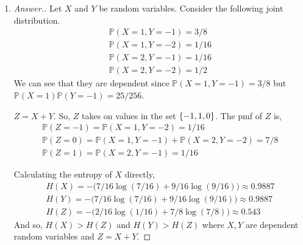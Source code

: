 \documentclass[10pt,twoside]{article}
\newcommand{\Pro}{\ensuremath{\mathbb{P}}}
\begin{document}
\begin{itemize}
\begin{enumerate}
\begin{proof}[Answer.]
\begin{gather*}
        H(Z,Y) = H(X,Y)
    \end{gather*}
    where we used the chain rule again as we did before. Now, expanding using the chain rule again and using our assumption that $X$ and $Y$ are independent,
    \begin{gather*}
        H(Z,Y) = H(Z) + H(Y|Z) = H(X,Y) = H(X) + H(Y) \\
        H(Z) + H(Y|Z) = H(X) + H(Y)
    \end{gather*}
    subtracting both sides by $H(Y|Z)$ we obtain,
    \begin{gather*}
        H(Z) = H(X) + H(Y) - H(Y|Z)
    \end{gather*}
    Since $H(Y) - H(Y|Z) = I(Y;Z)\geq 0$, 
    \begin{gather*}
        H(Z) \geq H(X)
    \end{gather*}
    as required.
    
    \end{proof}

    \item \begin{proof}[Answer.] Let $X$ and $Y$ be random variables. Consider the following joint distribution.
    \begin{gather*}
        \Pro(X = 1, Y=-1) = 3/8 \\
        \Pro(X = 1, Y=-2) = 1/16 \\
        \Pro(X = 2, Y=-1) = 1/16 \\
        \Pro(X= 2, Y=-2) = 1/2
    \end{gather*}
    We can see that they are dependent since $\Pro(X = 1, Y=-1) = 3/8$ but $\Pro(X = 1)\Pro(Y = -1) =  25/256$.

    $Z = X+Y$. So, $Z$ takes on values in the set $\{-1, 1, 0\}$. The pmf of $Z$ is,
    \begin{gather*}
        \Pro(Z = -1) = \Pro(X = 1, Y = -2) = 1/16 \\
        \Pro(Z = 0) = \Pro(X = 1, Y = -1) + \Pro(X = 2, Y = -2) = 7/8 \\
        \Pro(Z = 1) = \Pro(X = 2, Y = -1) = 1/16
    \end{gather*}

    Calculating the entropy of $X$ directly,
    \begin{gather*}
        H(X) = -\Big( 7/16\log(7/16) + 9/16\log(9/16) \Big) \approx 0.9887 \\
        H(Y) = -\Big( 7/16\log(7/16) + 9/16\log(9/16) \Big) \approx 0.9887 \\
        H(Z) = -\Big( 2/16\log(1/16) + 7/8\log(7/8)   \Big) \approx  0.543
    \end{gather*}
    And so, $H(X) > H(Z)$ and $H(Y) > H(Z)$ where $X,Y$ are dependent random variables and $Z = X+Y$.
    \end{proof}


\end{enumerate}
\end{itemize}
\end{document}
